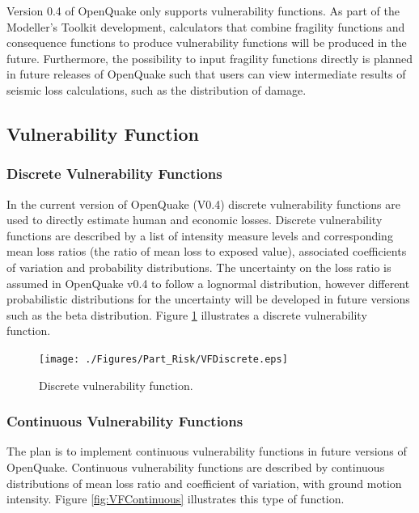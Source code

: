 Version 0.4 of OpenQuake only supports vulnerability functions. As part of the Modeller's Toolkit development, calculators that combine fragility functions and consequence functions to produce vulnerability functions will be produced in the future. Furthermore, the possibility to input fragility functions directly is planned in future releases of OpenQuake such that users can view intermediate results of seismic loss calculations, such as the distribution of damage. 

\subsection{Vulnerability Function}
\subsubsection{Discrete Vulnerability Functions}
In the current version of OpenQuake (V0.4) discrete vulnerability functions are used to directly estimate human and economic losses. Discrete vulnerability functions are described by a list of intensity measure levels and corresponding mean loss ratios (the ratio of mean loss to exposed value), associated coefficients of variation and probability distributions. The uncertainty on the loss ratio is assumed in OpenQuake v0.4 to follow a lognormal distribution, however different probabilistic distributions for the uncertainty will be developed in future versions such as the beta distribution. Figure \ref{fig:VFDiscrete} illustrates a discrete vulnerability function.

\begin{figure}[ht]
\centering
\texttt{[image: ./Figures/Part\_Risk/VFDiscrete.eps]}
\caption{Discrete vulnerability function.}
\label{fig:VFDiscrete}
\end{figure}

\subsubsection{Continuous Vulnerability Functions}
The plan is to implement continuous vulnerability functions in future versions of OpenQuake. Continuous vulnerability functions are described by continuous distributions of mean loss ratio and coefficient of variation, with ground motion intensity. Figure \ref{fig:VFContinuous} illustrates this type of function.

